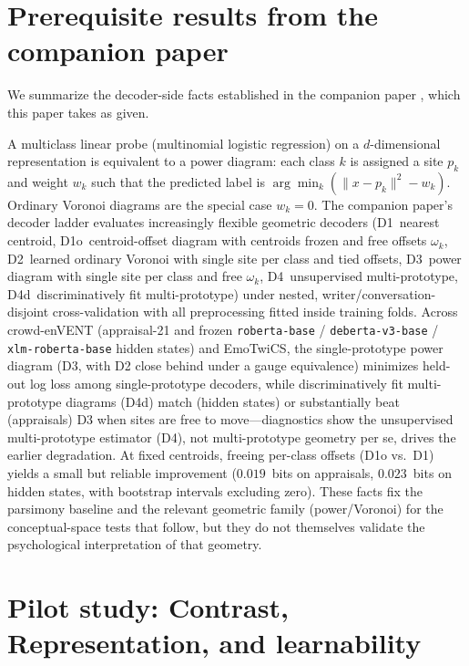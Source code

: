 \documentclass[11pt]{article}
\begin{document}
\section{Prerequisite results from the companion paper}
\label{sec:prerequisite}

We summarize the decoder-side facts established in the companion paper \citep{companion}, which this paper takes as given.

A multiclass linear probe (multinomial logistic regression) on a $d$-dimensional representation is equivalent to a power diagram: each class $k$ is assigned a site $p_k$ and weight $w_k$ such that the predicted label is $\arg\min_k (\lVert x-p_k\rVert^2 - w_k)$. Ordinary Voronoi diagrams are the special case $w_k=0$. The companion paper's decoder ladder evaluates increasingly flexible geometric decoders (D1~nearest centroid, D1o~centroid-offset diagram with centroids frozen and free offsets $\omega_k$, D2~learned ordinary Voronoi with single site per class and tied offsets, D3~power diagram with single site per class and free $\omega_k$, D4~unsupervised multi-prototype, D4d~discriminatively fit multi-prototype) under nested, writer/conversation-disjoint cross-validation with all preprocessing fitted inside training folds. Across crowd-enVENT (appraisal-21 and frozen \texttt{roberta-base} / \texttt{deberta-v3-base} / \texttt{xlm-roberta-base} hidden states) and EmoTwiCS, the single-prototype power diagram (D3, with D2 close behind under a gauge equivalence) minimizes held-out log loss among single-prototype decoders, while discriminatively fit multi-prototype diagrams (D4d) match (hidden states) or substantially beat (appraisals) D3 when sites are free to move---diagnostics show the unsupervised multi-prototype estimator (D4), not multi-prototype geometry per se, drives the earlier degradation. At fixed centroids, freeing per-class offsets (D1o vs.\ D1) yields a small but reliable improvement ($0.019$~bits on appraisals, $0.023$~bits on hidden states, with bootstrap intervals excluding zero). These facts fix the parsimony baseline and the relevant geometric family (power/Voronoi) for the conceptual-space tests that follow, but they do not themselves validate the psychological interpretation of that geometry.

\section{Pilot study: Contrast, Representation, and learnability}
\label{sec:contrast}
\end{document}

